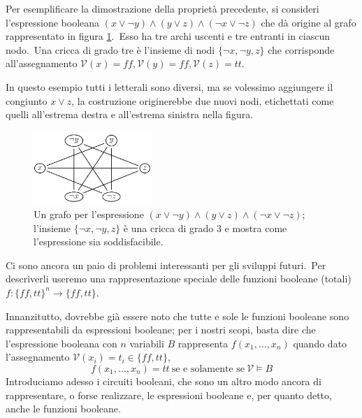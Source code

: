 \begin{example}
    Per esemplificare la dimostrazione della proprietà precedente, si consideri l'espressione booleana $(x \lor \neg y) \land (y \lor z) \land (\neg x \lor \neg z)$ che dà origine al grafo rappresentato in figura \ref{fig:cricca}.\
    Esso ha tre archi uscenti e tre entranti in ciascun nodo.\
    Una cricca di grado tre è l'insieme di nodi $\{\neg x, \neg y, z\}$ che corrisponde all'assegnamento $\mathcal{V}(x) = \mathit{ff}, \mathcal{V}(y) = \mathit{ff}, \mathcal{V}(z) = \mathit{tt}$.\

    In questo esempio tutti i letterali sono diversi, ma se volessimo aggiungere il congiunto $x \lor z$, la costruzione originerebbe due nuovi nodi, etichettati come quelli all'estrema destra e all'estrema sinistra nella figura.
    \begin{figure}[H]
        \centering
        \includegraphics[width = 0.4\textwidth]{images/grafoCricca.png}
        \caption{Un grafo per l'espressione $(x \lor \neg y) \land (y \lor z) \land (\neg x \lor \neg z)$; l'insieme $\{\neg x, \neg y,z\}$ è una cricca di grado 3 e mostra come l'espressione sia soddisfacibile.}
        \label{fig:cricca}
    \end{figure}
\end{example}

\noindent Ci sono ancora un paio di problemi interessanti per gli sviluppi futuri.\
Per descriverli useremo una rappresentazione speciale delle funzioni booleane (totali) $f: \{\mathit{ff}, \mathit{tt}\}^n \rightarrow \{\mathit{ff}, \mathit{tt}\}$.\

Innanzitutto, dovrebbe già essere noto che tutte e sole le funzioni booleane sono rappresentabili da espressioni booleane; per i nostri scopi, basta dire che l'espressione booleana con $n$ variabili $B$ rappresenta $f(x_1, \dots ,x_n)$ quando dato l'assegnamento $\mathcal{V}(x_i) = t_i \in \{\mathit{ff},\mathit{tt}\}$,
\[f(x_1, \dots ,x_n)=\mathit{tt}\ \mbox{se e solamente se}\ \mathcal{V} \vDash B\]
Introduciamo adesso i circuiti booleani, che sono un altro modo ancora di rappresentare, o forse realizzare, le espressioni booleane e, per quanto detto, anche le funzioni booleane.

